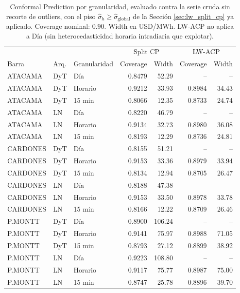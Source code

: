 \begin{table}[htbp]
    \centering
    \small
    \begin{tabular}{lllrrrr}
        \toprule
        & & & \multicolumn{2}{c}{Split CP} & \multicolumn{2}{c}{LW-ACP} \\
        Barra & Arq. & Granularidad & Coverage & Width & Coverage & Width \\
        \midrule
        ATACAMA  & DyT & Día     & 0.8479 & 52.29  & --     & --     \\
        ATACAMA  & DyT & Horario & 0.9212 & 33.93  & 0.8984 & 34.43  \\
        ATACAMA  & DyT & 15 min  & 0.8066 & 12.35  & 0.8733 & 24.74  \\
        ATACAMA  & LN  & Día     & 0.8220 & 46.79  & --     & --     \\
        ATACAMA  & LN  & Horario & 0.9134 & 32.73  & 0.8980 & 36.08  \\
        ATACAMA  & LN  & 15 min  & 0.8193 & 12.29  & 0.8736 & 24.81  \\
        CARDONES & DyT & Día     & 0.8155 & 51.21  & --     & --     \\
        CARDONES & DyT & Horario & 0.9153 & 33.36  & 0.8979 & 33.94  \\
        CARDONES & DyT & 15 min  & 0.8134 & 12.94  & 0.8705 & 26.47  \\
        CARDONES & LN  & Día     & 0.8188 & 47.38  & --     & --     \\
        CARDONES & LN  & Horario & 0.9153 & 33.50  & 0.8978 & 33.78  \\
        CARDONES & LN  & 15 min  & 0.8166 & 12.22  & 0.8709 & 26.46  \\
        P.MONTT  & DyT & Día     & 0.8900 & 106.24 & --     & --     \\
        P.MONTT  & DyT & Horario & 0.9141 & 75.97  & 0.8988 & 71.05  \\
        P.MONTT  & DyT & 15 min  & 0.8793 & 27.12  & 0.8899 & 38.92  \\
        P.MONTT  & LN  & Día     & 0.9223 & 108.80 & --     & --     \\
        P.MONTT  & LN  & Horario & 0.9117 & 75.77  & 0.8987 & 75.00  \\
        P.MONTT  & LN  & 15 min  & 0.8747 & 25.78  & 0.8896 & 39.70  \\
        \bottomrule
    \end{tabular}
    \caption{Conformal Prediction por granularidad, evaluado contra la serie cruda sin recorte de outliers, con el piso $\hat\sigma_h \geq \hat\sigma_{\text{global}}$ de la Sección \ref{sec:lw_split_cp} ya aplicado. Coverage nominal: 0.90. Width en USD/MWh. LW-ACP no aplica a Día (sin heterocedasticidad horaria intradiaria que explotar).}
    \label{tab:granularidad_cp}
\end{table}

